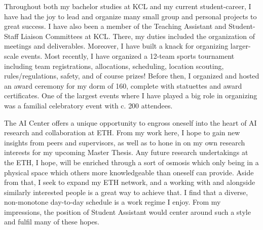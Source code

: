 \documentclass[11pt, a4paper]{awesome-cv}
\begin{document}
\begin{cvletter}
Throughout both my bachelor studies at KCL and my current student-career, I have had the joy to lead and organize many small group and personal projects to great success. I have also been a member of the Teaching Assistant and Student-Staff Liaison Committees at KCL. There, my duties included the organization of meetings and deliverables. Moreover, I have built a knack for organizing larger-scale events. Most recently, I have organized a 12-team sports tournament including team registrations, allocations, scheduling, location scouting, rules/regulations, safety, and of course prizes! Before then, I organized and hosted an award ceremony for my dorm of 160, complete with statuettes and award certificates. One of the largest events where I have played a big role in organizing was a familial celebratory event with c. 200 attendees.

\newpage

The AI Center offers a unique opportunity to engross oneself into the heart of AI research and collaboration at ETH. From my work here, I hope to gain new insights from peers and supervisors, as well as to hone in on my own research interests for my upcoming Master Thesis. Any future research undertakings at the ETH, I hope, will be enriched through a sort of osmosis which only being in a physical space which others more knowledgeable than oneself can provide. Aside from that, I seek to expand my ETH network, and a working with and alongside similarly interested people is a great way to achieve that. I find that a diverse, non-monotone day-to-day schedule is a work regime I enjoy. From my impressions, the position of Student Assistant would center around such a style and fulfil many of these hopes.



\end{cvletter}


\makeletterclosing
\end{document}
